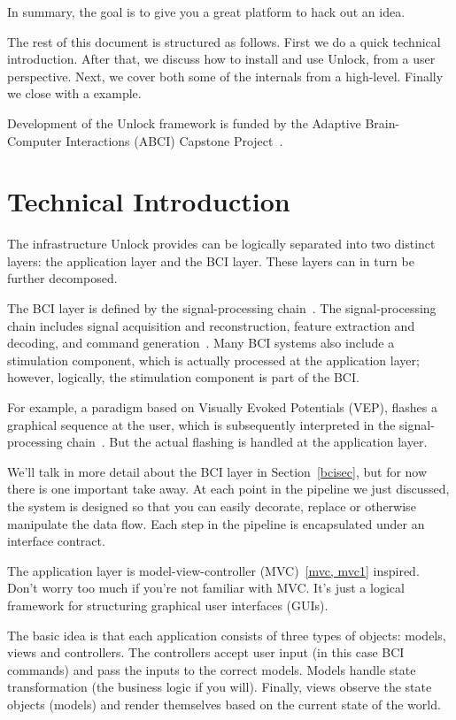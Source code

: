 \documentclass[11pt]{article}
\begin{document}
In summary, the goal is to give you a great platform to hack out an idea.

The rest of this document is structured as follows.  %
First we do a quick technical introduction.  After that, we discuss how to install and use Unlock, from a user perspective.  Next, we cover both some of the internals from a high-level.  Finally we close with a example.

Development of the Unlock framework is funded by the Adaptive Brain-Computer Interactions (ABCI) Capstone Project~\cite{abci}.

\section{Technical Introduction}

The infrastructure Unlock provides can be logically separated into two distinct layers: the application layer and the BCI layer.  These layers can in turn be further decomposed.

The BCI layer is defined by the signal-processing chain~\cite{signalprocessing}.  The signal-processing chain includes signal acquisition and reconstruction, feature extraction and decoding, and command generation~\cite{neuraleng}.  Many BCI systems also include a stimulation component, which is actually processed at the application layer; however, logically, the stimulation component is part of the BCI.

For example, a paradigm based on Visually Evoked Potentials (VEP), flashes a graphical sequence at the user, which is subsequently interpreted in the signal-processing chain~\cite{vep}.  But the actual flashing is handled at the application layer.

We'll talk in more detail about the BCI layer in Section~\ref{bcisec}, but for now there is one important take away.  At each point in the pipeline we just discussed, the system is designed so that you can easily decorate, replace or otherwise manipulate the data flow.  Each step in the pipeline is encapsulated under an interface contract.

The application layer is model-view-controller (MVC)~\ref{mvc, mvc1} inspired.  Don't worry too much if you're not familiar with MVC.  It's just a logical framework for structuring graphical user interfaces (GUIs).  

The basic idea is that each application consists of three types of objects: models, views and controllers.  The controllers accept user input (in this case BCI commands) and pass the inputs to the correct models.  Models handle state transformation (the business logic if you will).  Finally, views observe the state objects (models) and render themselves based on the current state of the world.
\end{document}
